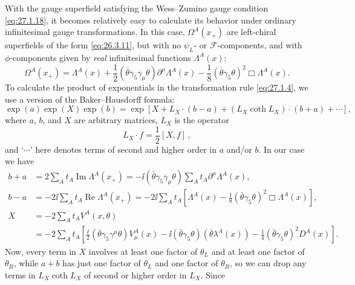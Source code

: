 With the gauge superfield satisfying the Wess--Zumino gauge condition
\eqref{eq:27.1.18}, it becomes relatively easy to calculate its behavior
under ordinary infinitesimal gauge transformations. In this case,
\(\Omega^A(x_+)\) are left-chiral superfields of the form
\eqref{eq:26.3.11}, but with no \(\psi_L\)- or
\(\mathcal{F}\)-components, and with \(\phi\)-components given by
\textit{real} infinitesimal functions \(\Lambda^A(x)\):
\begin{equation}
  \Omega^A(x_+)=\Lambda^A(x)
  +\frac12(\bar\theta\gamma_5\gamma_\mu\theta)
    \partial^\mu\Lambda^A(x)
  -\frac18(\bar\theta\gamma_5\theta)^2\Box\Lambda^A(x).
  \tag{27.1.20}\label{eq:27.1.20}
\end{equation}
To calculate the product of exponentials in the transformation rule
\eqref{eq:27.1.4}, we use a version of the Baker--Hausdorff formula:
\begin{equation}
  \exp(a)\exp(X)\exp(b)
  =\exp\left[
    X+L_X\mathbin{\cdot}(b-a)
    +(L_X\coth L_X)\mathbin{\cdot}(b+a)+\cdots
  \right],
  \tag{27.1.21}\label{eq:27.1.21}
\end{equation}
where \(a\), \(b\), and \(X\) are arbitrary matrices, \(L_X\) is the
operator
\begin{equation}
  L_X\mathbin{\cdot} f=\frac12[X,f]\,,
  \tag{27.1.22}\label{eq:27.1.22}
\end{equation}
and `\(\cdots\)' here denotes terms of second and higher order in \(a\)
and/or \(b\). In our case we have
\[
  \begin{aligned}
  b+a
  &=2\sum_A t_A\operatorname{Im}\Lambda^A(x_+)
   =-\ii(\bar\theta\gamma_5\gamma_\mu\theta)
     \sum_A t_A\partial^\mu\Lambda^A(x),
  \\
  b-a
  &=-2\ii\sum_A t_A\operatorname{Re}\Lambda^A(x_+)
   =-2\ii\sum_A t_A\left[
     \Lambda^A(x)-\frac18(\bar\theta\gamma_5\theta)^2
     \Box\Lambda^A(x)
   \right],
  \\
  X
  &=-2\sum_A t_AV^A(x,\theta)
  \\
  &=-2\sum_A t_A\left[
     \frac{\ii}{2}(\bar\theta\gamma_5\gamma^\mu\theta)V^A_\mu(x)
     -\ii(\bar\theta\gamma_5\theta)(\bar\theta\lambda^A(x))
     -\frac14(\bar\theta\gamma_5\theta)^2D^A(x)
   \right].
  \end{aligned}
\]
Now, every term in \(X\) involves at least one factor of \(\theta_L\) and
at least one factor of \(\theta_R\), while \(a+b\) has just one factor of
\(\theta_L\) and one factor of \(\theta_R\), so we can drop any terms in
\(L_X\coth L_X\) of second or higher order in \(L_X\). Since
